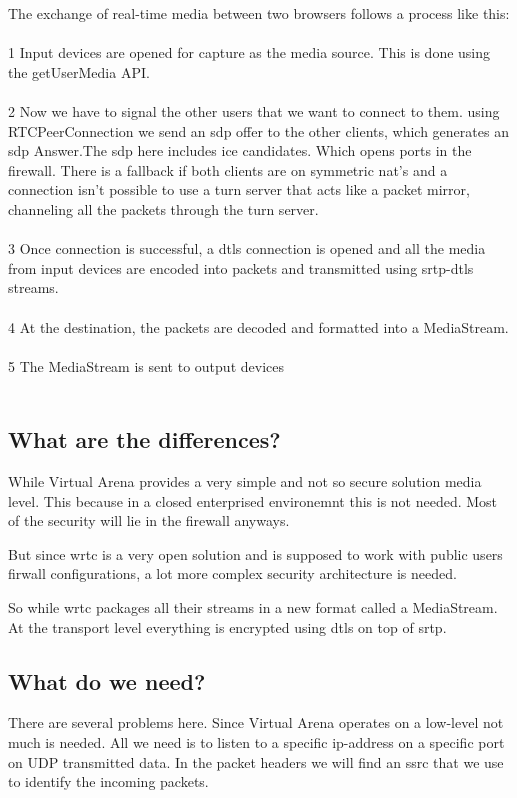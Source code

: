 The exchange of real-time media between two browsers follows a process like this:
\\
\\
1 Input devices are opened for capture as the media source. This is done using the getUserMedia API.
\\
\\
2 Now we have to signal the other users that we want to connect to them. using RTCPeerConnection we send an \gls{sdp} offer to the other clients, which generates an \gls{sdp} Answer.The \gls{sdp} here includes \gls{ice} candidates. Which opens ports in the firewall. There is a fallback if both clients are on symmetric \gls{nat}'s and a connection isn't possible to use a \gls{turn} server that acts like a packet mirror, channeling all the packets through the \gls{turn} server.
\\
\\
3 Once connection is successful, a \gls{dtls} connection is opened and all the media from input devices are encoded into packets and transmitted using \gls{srtp}-\gls{dtls} streams.
\\
\\
4 At the destination, the packets are decoded and formatted into a MediaStream.
\\
\\
5 The MediaStream is sent to output devices
\\
\\

\subsection{What are the differences?}
While Virtual Arena provides a very simple and not so secure solution media level. This because in a closed enterprised environemnt this is not needed. Most of the security will lie in the firewall anyways.

But since \gls{wrtc} is a very open solution and is supposed to work with public users firwall configurations, a lot more complex security architecture is needed.

So while \gls{wrtc} packages all their streams in a new format called a MediaStream. At the transport level everything is encrypted using \gls{dtls} on top of \gls{srtp}.

\subsection{What do we need?}
There are several problems here. Since Virtual Arena operates on a low-level not much is needed. All we need is to listen to a specific ip-address on a specific port on UDP transmitted data. In the packet headers we will find an \gls{ssrc} that we use to identify the incoming packets.

